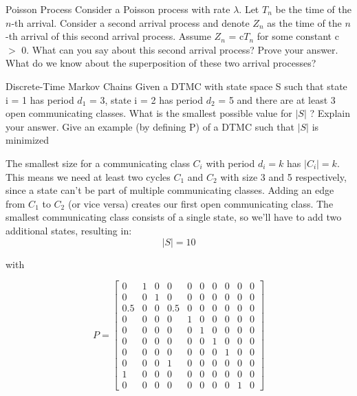 \begin{problem}{Poisson Process}
Consider a Poisson process with rate $\lambda$. Let $T_n$ be the time of the $n$-th arrival. Consider a second arrival process and denote $Z_n$ as the time of the $n$-th arrival of this second arrival process. Assume $Z_n$ = c$T_n$ for some constant c $>$ 0. What can you say about this second arrival process? Prove your answer. What do we know about the superposition of these two arrival processes?
\end{problem}

\begin{problem}{Discrete-Time Markov Chains}
Given a DTMC with state space S such that state i = 1 has period $d_1$ = 3, state i = 2 has period $d_2$ = 5 and there are at least 3 open communicating classes. What is the smallest possible value for $| S |$  ? Explain your answer. Give an example (by defining P) of a DTMC such that $| S |$ is minimized
\end{problem}

\begin{solution}
  The smallest size for a communicating class $C_i$ with period $d_i=k$ has $|C_i|=k$. This means we need at least two cycles $C_1$ and $C_2$ with size 3 and 5 respectively, since a state can't be part of multiple communicating classes. Adding an edge from $C_1$ to $C_2$ (or vice versa) creates our first open communicating class. The smallest communicating class consists of a single state, so we'll have to add two additional states, resulting in:
  \[
  \boxed{| S | = 10}
  \]
\end{solution}

with 

\[
P =
\begin{bmatrix}
  0 & 1 & 0 & 0 & 0 & 0 & 0 & 0 & 0 & 0 \\
  0 & 0 & 1 & 0 & 0 & 0 & 0 & 0 & 0 & 0 \\
  0.5 & 0 & 0 & 0.5 & 0 & 0 & 0 & 0 & 0 & 0 \\
  0 & 0 & 0 & 0 & 1 & 0 & 0 & 0 & 0 & 0 \\
  0 & 0 & 0 & 0 & 0 & 1 & 0 & 0 & 0 & 0 \\
  0 & 0 & 0 & 0 & 0 & 0 & 1 & 0 & 0 & 0 \\
  0 & 0 & 0 & 0 & 0 & 0 & 0 & 1 & 0 & 0 \\
  0 & 0 & 0 & 1 & 0 & 0 & 0 & 0 & 0 & 0 \\
  1 & 0 & 0 & 0 & 0 & 0 & 0 & 0 & 0 & 0 \\
  0 & 0 & 0 & 0 & 0 & 0 & 0 & 0 & 1 & 0 
\end{bmatrix}
\]

